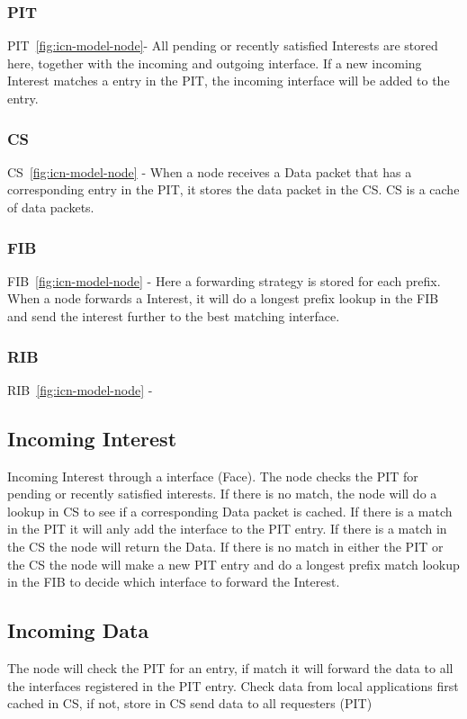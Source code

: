 \subsubsection{\gls{PIT}}
\gls{PIT}~\autoref{fig:icn-model-node}- All pending or recently satisfied Interests are stored here, together with the incoming and outgoing interface.
If a new incoming Interest matches a entry in the \gls{PIT}, the incoming interface will be added to the entry. 


\subsubsection{\gls{CS}}
\gls{CS}~\autoref{fig:icn-model-node} - When a node receives a Data packet that has a corresponding entry in the \gls{PIT}, it stores the data packet in the \gls{CS}. \gls{CS} is a cache of data packets.


\subsubsection{\gls{FIB}}
\gls{FIB}~\autoref{fig:icn-model-node} - Here a forwarding strategy is stored for each prefix. 
When a node forwards a Interest, it will do a longest prefix lookup in the \gls{FIB} and send the interest further to the best matching interface.


\subsubsection{\gls{RIB}}
\gls{RIB}~\autoref{fig:icn-model-node} - 

 
\subsection{Incoming Interest}
Incoming Interest through a interface (Face). The node checks the \gls{PIT} for pending or recently satisfied interests. 
If there is no match, the node will do a lookup in \gls{CS} to see if a corresponding Data packet is cached. 
If there is a match in the \gls{PIT} it will anly add the interface to the \gls{PIT} entry. If there is a match in the \gls{CS} the node will return the Data. 
If there is no match in either the \gls{PIT} or the \gls{CS} the node will make a new \gls{PIT} entry and do a longest prefix match lookup in the \gls{FIB} to decide which interface to forward the Interest.

\subsection{Incoming Data}
The node will check  the \gls{PIT} for an entry, if match it will forward the data to all the interfaces registered in the \gls{PIT} entry.
Check data from local applications first cached in \gls{CS}, if not, store in \gls{CS} send data to all requesters (\gls{PIT})

